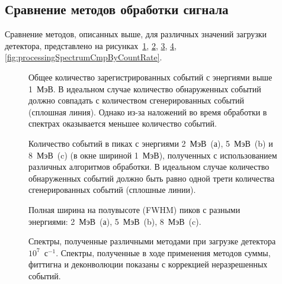 
\FloatBarrier
\subsection{Сравнение методов обработки сигнала}

Сравнение методов, описанных выше, для различных значений загрузки детектора, представлено на рисунках~\ref{fig:processingTotalCountRate},  \ref{fig:processingByWindowCountRate}, \ref{fig:processingByWindowFwhm}, \ref{fig:processingSpectrumCmpByMethods}, \ref{fig:processingSpectrumCmpByCountRate}. 

\begin{figure}[ht!]
  \caption{Общее количество зарегистрированных событий с энергиями выше 1~МэВ. В идеальном случае количество обнаруженных событий должно совпадать с количеством сгенерированных событий (сплошная линия). Однако из-за наложений во время обработки в спектрах оказывается меньшее количество событий.~\cite{Khilkevitch2020} }
  \label{fig:processingTotalCountRate}
\end{figure}

\begin{figure}[ht!]
  \caption{ Количество событий в пиках с энергиями 2~МэВ~(а), 5~МэВ~(b) и 8~МэВ~(c) (в окне шириной 1~МэВ), полученных с использованием различных алгоритмов обработки. В идеальном случае количество обнаруженных событий должно быть равно одной трети количества сгенерированных событий (сплошные линии).~\cite{Khilkevitch2020} }
  \label{fig:processingByWindowCountRate}
\end{figure}

\begin{figure}[ht!]
  \caption{ Полная ширина на полувысоте (FWHM) пиков с разными энергиями: 2~МэВ~(а), 5~МэВ~(b), 8~МэВ~(c).~\cite{Khilkevitch2020} }
  \label{fig:processingByWindowFwhm}
\end{figure}

\begin{figure}[ht!]
  \caption{ Спектры, полученные различными методами при загрузке детектора $10^7$~с${}^{-1}$. Спектры, полученные в ходе применения методов суммы, фиттигна и деконволюции показаны с коррекцией неразрешенных событий.~\cite{Khilkevitch2020} }
  \label{fig:processingSpectrumCmpByMethods}
\end{figure}

